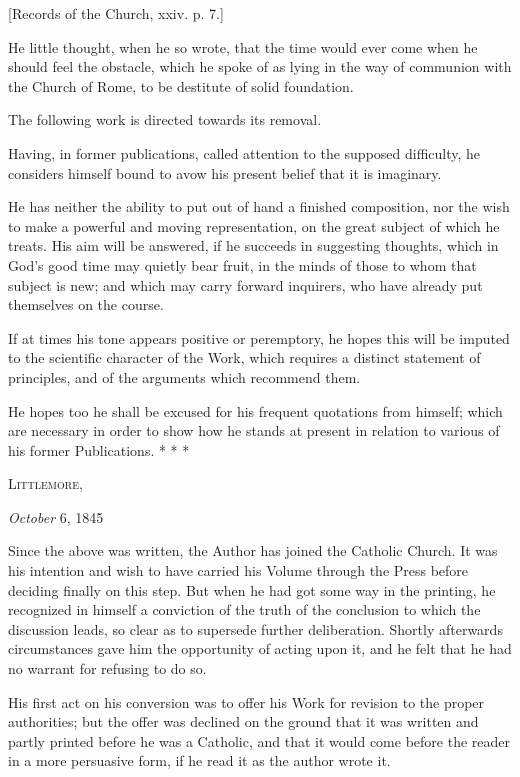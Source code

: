 [Records of the Church, xxiv. p. 7.]


He little thought, when he so wrote, that the time
would ever come when he should feel the obstacle, which
he spoke of as lying in the way of communion with the
Church of Rome, to be destitute of solid foundation.


The following work is directed towards its removal.


Having, in former publications, called attention to
the supposed difficulty, he considers himself bound to
avow his present belief that it is imaginary.


He has neither the ability to put out of hand a
finished composition, nor the wish to make a powerful and
moving representation, on the great subject of which he
treats. His aim will be answered, if he succeeds in
suggesting thoughts, which in God's good time may quietly
bear fruit, in the minds of those to whom that subject is
new; and which may carry forward inquirers, who have
already put themselves on the course.


If at times his tone appears positive or peremptory,
he hopes this will be imputed to the scientific character
of the Work, which requires a distinct statement of
principles, and of the arguments which recommend them.


He hopes too he shall be excused for his frequent
quotations from himself; which are necessary in order to
show how he stands at present in relation to various of
his former Publications. * *
*


L\textsc{ittlemore},

\emph{
October} 6, 1845






Since the above was written, the Author has joined the
Catholic Church. It was his intention and wish to have
carried his Volume through the Press before deciding finally on this step. But when he had got some way in the
printing, he recognized in himself a conviction of the
truth of the conclusion to which the discussion leads, so
clear as to supersede further deliberation. Shortly
afterwards circumstances gave him the opportunity of
acting upon it, and he felt that he had no warrant for
refusing to do so.


His first act on his conversion was to offer his Work
for revision to the proper authorities; but the offer was
declined on the ground that it was written and partly
printed before he was a Catholic, and that it would come
before the reader in a more persuasive form, if he read
it as the author wrote it.


